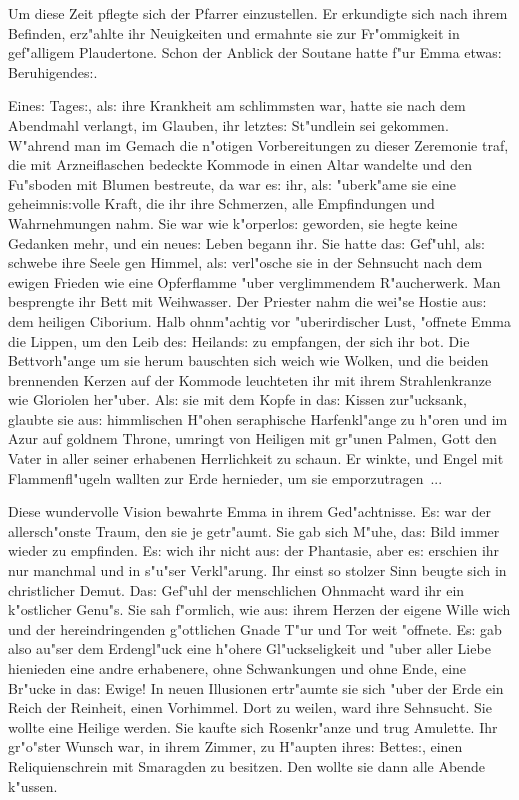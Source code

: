 \documentclass[oneside,12pt]{book}
\newcommand{\s}{s:}%
\begin{document}
Um diese Zeit pflegte sich der Pfarrer einzustellen. Er erkundigte
sich nach ihrem Befinden, erz"ahlte ihr Neuigkeiten und ermahnte
sie zur Fr"ommigkeit in gef"alligem Plaudertone. Schon der Anblick
der Soutane hatte f"ur Emma etwa{\s} Beruhigende{\s}.

Eine{\s} Tage{\s}, al{\s} ihre Krankheit am schlimmsten war, hatte
sie nach dem Abendmahl verlangt, im Glauben, ihr letzte{\s}
St"undlein sei gekommen. W"ahrend man im Gemach die n"otigen
Vorbereitungen zu dieser Zeremonie traf, die mit Arzneiflaschen
bedeckte Kommode in einen Altar wandelte und den Fu"sboden mit
Blumen bestreute, da war e{\s} ihr, al{\s} "uberk"ame sie eine
geheimni{\s}volle Kraft, die ihr ihre Schmerzen, alle Empfindungen
und Wahrnehmungen nahm. Sie war wie k"orperlo{\s} geworden, sie
hegte keine Gedanken mehr, und ein neue{\s} Leben begann ihr. Sie
hatte da{\s} Gef"uhl, al{\s} schwebe ihre Seele gen Himmel, al{\s}
verl"osche sie in der Sehnsucht nach dem ewigen Frieden wie eine
Opferflamme "uber verglimmendem R"aucherwerk. Man besprengte ihr
Bett mit Weihwasser. Der Priester nahm die wei"se Hostie au{\s}
dem heiligen Ciborium. Halb ohnm"achtig vor "uberirdischer Lust,
"offnete Emma die Lippen, um den Leib de{\s} Heiland{\s} zu
empfangen, der sich ihr bot. Die Bettvorh"ange um sie herum
bauschten sich weich wie Wolken, und die beiden brennenden Kerzen
auf der Kommode leuchteten ihr mit ihrem Strahlenkranze wie
Gloriolen her"uber. Al{\s} sie mit dem Kopfe in da{\s} Kissen
zur"ucksank, glaubte sie au{\s} himmlischen H"ohen seraphische
Harfenkl"ange zu h"oren und im Azur auf goldnem Throne, umringt
von Heiligen mit gr"unen Palmen, Gott den Vater in aller seiner
erhabenen Herrlichkeit zu schaun. Er winkte, und Engel mit
Flammenfl"ugeln wallten zur Erde hernieder, um sie emporzutragen~...

Diese wundervolle Vision bewahrte Emma in ihrem Ged"achtnisse.
E{\s} war der allersch"onste Traum, den sie je getr"aumt. Sie gab
sich M"uhe, da{\s} Bild immer wieder zu empfinden. E{\s} wich ihr
nicht au{\s} der Phantasie, aber e{\s} erschien ihr nur manchmal
und in s"u"ser Verkl"arung. Ihr einst so stolzer Sinn beugte sich
in christlicher Demut. Da{\s} Gef"uhl der menschlichen Ohnmacht
ward ihr ein k"ostlicher Genu"s. Sie sah f"ormlich, wie au{\s}
ihrem Herzen der eigene Wille wich und der hereindringenden
g"ottlichen Gnade T"ur und Tor weit "offnete. E{\s} gab also
au"ser dem Erdengl"uck eine h"ohere Gl"uckseligkeit und "uber
aller Liebe hienieden eine andre erhabenere, ohne Schwankungen und
ohne Ende, eine Br"ucke in da{\s} Ewige! In neuen Illusionen
ertr"aumte sie sich "uber der Erde ein Reich der Reinheit, einen
Vorhimmel. Dort zu weilen, ward ihre Sehnsucht. Sie wollte eine
Heilige werden. Sie kaufte sich Rosenkr"anze und trug Amulette.
Ihr gr"o"ster Wunsch war, in ihrem Zimmer, zu H"aupten ihre{\s}
Bette{\s}, einen Reliquienschrein mit Smaragden zu besitzen. Den
wollte sie dann alle Abende k"ussen.
\end{document}
